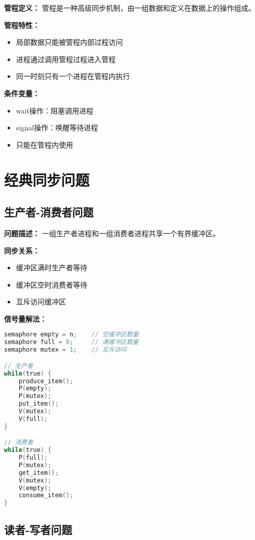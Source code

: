 \documentclass[lang=cn,newtx,10pt,scheme=chinese]{../../elegantbook}
\begin{document}
\textbf{管程定义：}
管程是一种高级同步机制，由一组数据和定义在数据上的操作组成。

\textbf{管程特性：}
\begin{itemize}
  \item 局部数据只能被管程内部过程访问
  \item 进程通过调用管程过程进入管程
  \item 同一时刻只有一个进程在管程内执行
\end{itemize}

\textbf{条件变量：}
\begin{itemize}
  \item wait操作：阻塞调用进程
  \item signal操作：唤醒等待进程
  \item 只能在管程内使用
\end{itemize}

\section{经典同步问题}

\subsection{生产者-消费者问题}

\textbf{问题描述：}
一组生产者进程和一组消费者进程共享一个有界缓冲区。

\textbf{同步关系：}
\begin{itemize}
  \item 缓冲区满时生产者等待
  \item 缓冲区空时消费者等待
  \item 互斥访问缓冲区
\end{itemize}

\textbf{信号量解法：}
\begin{lstlisting}[language=C]
semaphore empty = n;    // 空缓冲区数量
semaphore full = 0;     // 满缓冲区数量  
semaphore mutex = 1;    // 互斥访问

// 生产者
while(true) {
    produce_item();
    P(empty);
    P(mutex);
    put_item();
    V(mutex);
    V(full);
}

// 消费者
while(true) {
    P(full);
    P(mutex);
    get_item();
    V(mutex);
    V(empty);
    consume_item();
}
\end{lstlisting}

\subsection{读者-写者问题}
\end{document}
